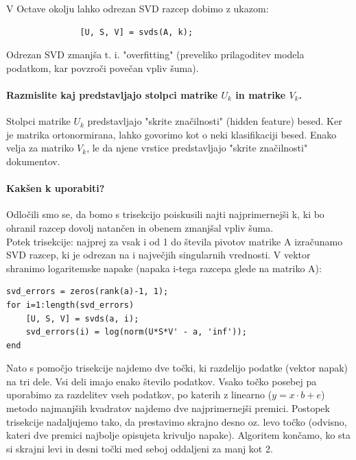 \documentclass{article}
\begin{document}
V Octave okolju lahko odrezan SVD razcep dobimo z ukazom:

\begin{lstlisting}
               [U, S, V] = svds(A, k);
\end{lstlisting}
Odrezan SVD zmanjša t. i. "overfitting" (preveliko prilagoditev modela podatkom, kar povzroči povečan vpliv šuma).

\paragraph{Razmislite kaj predstavljajo stolpci matrike \( U_{k} \) in matrike \( V_{k} \).}
Stolpci matrike \( U_{k} \) predstavljajo "skrite značilnosti" (hidden feature) besed. Ker je matrika ortonormirana, lahko govorimo kot o neki klasifikaciji besed.
Enako velja za matriko  \( V_{k} \), le da njene vrstice predstavljajo "skrite značilnosti" dokumentov.

\paragraph{Kakšen k uporabiti?}
Odločili smo se, da bomo s trisekcijo poiskusili najti najprimernejši k, ki bo ohranil razcep dovolj natančen in obenem zmanjšal vpliv šuma. 
\pagebreak \\
Potek trisekcije: najprej za vsak i od 1 do števila pivotov matrike A izračunamo SVD razcep, ki je odrezan na i največjih singularnih vrednosti. V vektor shranimo logaritemske napake (napaka i-tega razcepa glede na matriko A):

\begin{lstlisting}
svd_errors = zeros(rank(a)-1, 1);
for i=1:length(svd_errors)
	[U, S, V] = svds(a, i);
	svd_errors(i) = log(norm(U*S*V' - a, 'inf'));
end
\end{lstlisting}

Nato s pomočjo trisekcije najdemo dve točki, ki razdelijo podatke (vektor napak) na tri dele. Vsi deli imajo enako število podatkov. Vsako točko posebej pa uporabimo za razdelitev vseh podatkov, po katerih z linearno (\( y = x\cdot b + e \)) metodo najmanjših kvadratov najdemo dve najprimernejši premici. Postopek trisekcije nadaljujemo tako, da prestavimo skrajno desno oz. levo točko (odvisno, kateri dve premici najbolje opisujeta krivuljo napake). Algoritem končamo, ko sta si skrajni levi in desni točki med seboj oddaljeni za manj kot 2. \\ 
\end{document}

